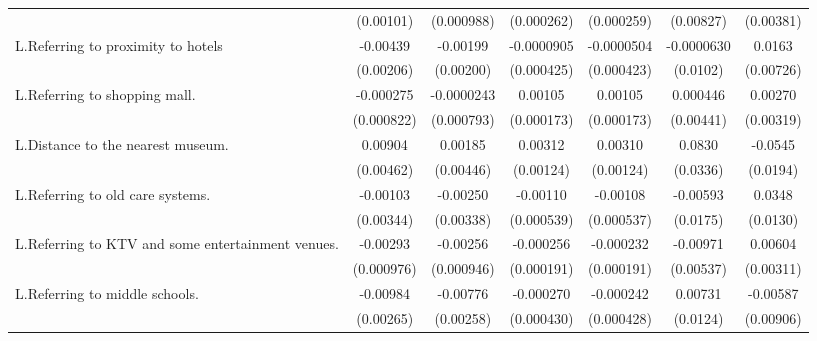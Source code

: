 {\begin{tabular}{l*{6}{c}}
                    &   (0.00101)         &  (0.000988)         &  (0.000262)         &  (0.000259)         &   (0.00827)         &   (0.00381)         \\
\addlinespace
L.Referring to proximity to hotels&    -0.00439\sym{**} &    -0.00199         &  -0.0000905         &  -0.0000504         &  -0.0000630         &      0.0163\sym{**} \\
                    &   (0.00206)         &   (0.00200)         &  (0.000425)         &  (0.000423)         &    (0.0102)         &   (0.00726)         \\
\addlinespace
L.Referring to shopping mall.&   -0.000275         &  -0.0000243         &     0.00105\sym{***}&     0.00105\sym{***}&    0.000446         &     0.00270         \\
                    &  (0.000822)         &  (0.000793)         &  (0.000173)         &  (0.000173)         &   (0.00441)         &   (0.00319)         \\
\addlinespace
L.Distance to the nearest museum.&     0.00904\sym{*}  &     0.00185         &     0.00312\sym{**} &     0.00310\sym{**} &      0.0830\sym{**} &     -0.0545\sym{***}\\
                    &   (0.00462)         &   (0.00446)         &   (0.00124)         &   (0.00124)         &    (0.0336)         &    (0.0194)         \\
\addlinespace
L.Referring to old care systems.&    -0.00103         &    -0.00250         &    -0.00110\sym{**} &    -0.00108\sym{**} &    -0.00593         &      0.0348\sym{***}\\
                    &   (0.00344)         &   (0.00338)         &  (0.000539)         &  (0.000537)         &    (0.0175)         &    (0.0130)         \\
\addlinespace
L.Referring to KTV and some entertainment venues.&    -0.00293\sym{***}&    -0.00256\sym{***}&   -0.000256         &   -0.000232         &    -0.00971\sym{*}  &     0.00604\sym{*}  \\
                    &  (0.000976)         &  (0.000946)         &  (0.000191)         &  (0.000191)         &   (0.00537)         &   (0.00311)         \\
\addlinespace
L.Referring to middle schools.&    -0.00984\sym{***}&    -0.00776\sym{***}&   -0.000270         &   -0.000242         &     0.00731         &    -0.00587         \\
                    &   (0.00265)         &   (0.00258)         &  (0.000430)         &  (0.000428)         &    (0.0124)         &   (0.00906)         \\

\end{tabular}}
